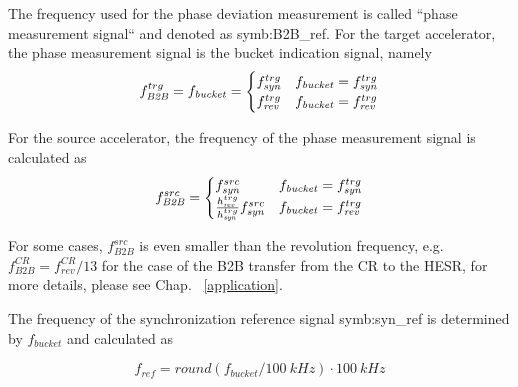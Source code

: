The frequency used for the phase deviation measurement is called ``phase measurement signal`` and denoted as \gls{symb:B2B_ref}. For the target accelerator, the phase measurement signal is the bucket indication signal, namely 
\begin{eqnarray}
f_{\mathit{B2B}}^{trg}=f_{\mathit{bucket}}=
\begin{cases}
f_{\mathit{syn}}^{trg} &f_{\mathit{bucket}}=f_{\mathit{syn}}^{trg}\cr

f_{\mathit{rev}}^{trg} &f_{\mathit{bucket}}=f_{\mathit{rev}}^{trg}
\end{cases}
\end{eqnarray} 

For the source accelerator, the frequency of the phase measurement signal is calculated as
\begin{eqnarray}
f_{\mathit{B2B}}^{src}=
\begin{cases}
f_{\mathit{syn}}^{src} &f_{\mathit{bucket}}=f_{\mathit{syn}}^{trg}\cr

\frac{h_{\mathit{rev}}^{trg}}{h_{\mathit{syn}}^{trg}}f_{\mathit{syn}}^{src} &f_{\mathit{bucket}}=f_{\mathit{rev}}^{trg}
\end{cases}
\end{eqnarray}

For some cases, $f_{\mathit{B2B}}^{src}$ is even smaller than the revolution frequency, e.g. $f_{\mathit{B2B}}^{CR}=f_{\mathit{rev}}^{CR}/13$ for the case of the B2B transfer from the CR to the HESR, for more details, please see Chap. ~\ref{application}.

The frequency of the synchronization reference signal \gls{symb:syn_ref} is determined by $f_{\mathit{bucket}}$ and calculated as

\begin{equation}
\label{round}
	f_\mathit{ref}=\textit{round} (f_{\mathit{bucket}}/\SI{100}{kHz})\cdot \SI{100}{kHz}
\end{equation}


